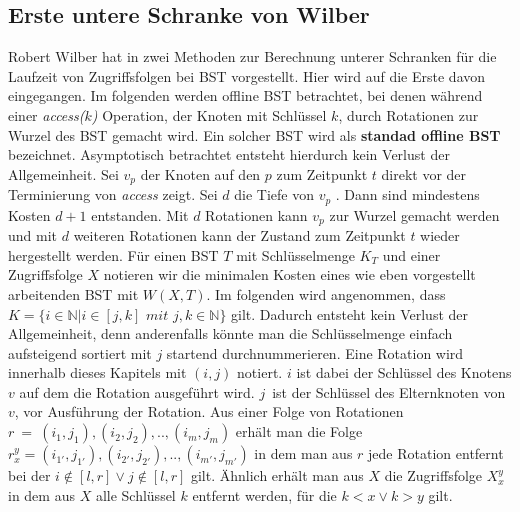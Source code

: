 \documentclass[a4paper,12pt]{article}
\begin{document}
\subsection{Erste untere Schranke von Wilber}
Robert Wilber hat in \cite{wilberLowerBounds} zwei Methoden zur Berechnung unterer Schranken für die Laufzeit von Zugriffsfolgen bei BST vorgestellt. Hier wird auf die Erste davon eingegangen. Im folgenden werden offline BST betrachtet, bei denen während einer \textit{access($k$)} Operation, der Knoten mit Schlüssel $k$, durch Rotationen zur Wurzel des BST gemacht wird. Ein solcher BST wird als \textbf{standad offline BST} bezeichnet. Asymptotisch betrachtet entsteht hierdurch kein Verlust der Allgemeinheit. Sei $v_p$ der Knoten auf den $p$ zum Zeitpunkt $t$ direkt vor der Terminierung von \textit{access} zeigt. Sei $d$ die Tiefe von $v_p$ . Dann sind mindestens Kosten $d + 1$ entstanden. Mit $d$ Rotationen kann $v_p$ zur Wurzel gemacht werden und mit $d$ weiteren Rotationen kann der Zustand zum Zeitpunkt $t$ wieder hergestellt werden.
Für einen BST $T$ mit Schlüsselmenge $K_T$ und einer Zugriffsfolge $X$ notieren wir die minimalen Kosten eines wie eben vorgestellt arbeitenden BST mit $W(X, T)$. Im folgenden wird angenommen, dass \\
$K = \{  i \in \mathbb{N} \vert i \in \left[j,k\right] \textit{ mit } j,k \in  \mathbb{N} \} $ gilt. Dadurch entsteht kein Verlust der Allgemeinheit, denn anderenfalls könnte man die Schlüsselmenge einfach aufsteigend sortiert mit $j$ startend durchnummerieren. Eine Rotation wird innerhalb dieses Kapitels mit $\left(i, j\right)$ notiert. $i$ ist dabei der Schlüssel des Knotens $v$ auf dem die Rotation ausgeführt wird. $j$~ist der Schlüssel des Elternknoten von $v$, vor Ausführung der Rotation. Aus einer Folge von Rotationen $r~=~\left(i_1,j_1 \right),\left(i_2,j_2 \right),..,\left(i_m,j_m \right)$ erhält man die Folge  $r^y_x = \left(i_{1'},j_{1'}\right),\left(i_{2'},j_{2'} \right),..,\left(i_{m'},j_{m'} \right)$  in dem man aus $r$ jede Rotation entfernt bei der $i\notin \left[l,r\right] \lor j\notin \left[l,r\right]$ gilt. Ähnlich erhält man aus $X$ die Zugriffsfolge $X^y_x$ in dem aus $X$ alle Schlüssel $k$ entfernt werden, für die $k < x  \lor k > y$ gilt.
\end{document}
